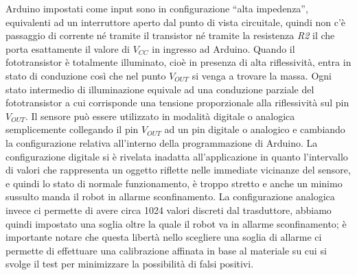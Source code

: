 Arduino impostati come input sono in configurazione ``alta impedenza'', 
equivalenti ad un interruttore aperto dal punto di vista circuitale, quindi 
non c'è passaggio di corrente né tramite il transistor né tramite la 
resistenza \textit{R2} il che porta esattamente il valore di $V_{CC}$ in 
ingresso ad Arduino. Quando il fototransistor è totalmente illuminato, cioè in 
presenza di alta riflessività, entra in stato di conduzione così che nel punto 
$V_{OUT}$ si venga a trovare la massa. Ogni stato intermedio di illuminazione 
equivale ad una conduzione parziale del fototransistor a cui corrisponde una 
tensione proporzionale alla riflessività sul pin $V_{OUT}$. Il sensore può 
essere utilizzato in modalità digitale o analogica semplicemente collegando il 
pin $V_{OUT}$ ad un pin digitale o analogico e cambiando la configurazione 
relativa all'interno della programmazione di Arduino. La configurazione 
digitale si è rivelata inadatta all'applicazione in quanto l'intervallo di 
valori che rappresenta un oggetto riflette nelle immediate vicinanze del 
sensore, e quindi lo stato di normale funzionamento, è troppo stretto e anche 
un minimo sussulto manda il robot in allarme sconfinamento. La configurazione 
analogica invece ci permette di avere circa 1024 valori discreti dal 
trasduttore, abbiamo quindi impostato una soglia oltre la quale il robot va in 
allarme sconfinamento; è importante notare che questa libertà nello scegliere 
una soglia di allarme ci permette di effettuare una calibrazione affinata in 
base al materiale su cui si svolge il test per minimizzare la possibilità di 
falsi positivi. 
